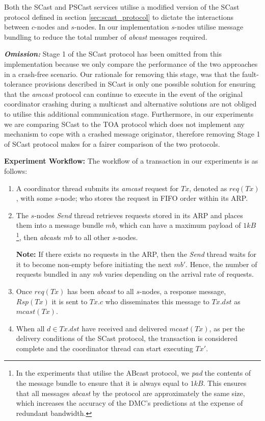 	Both the \textsf{SCast} and \textsf{PSCast} services utilise a modified version of the \textsf{SCast} protocol defined in section \ref{sec:scast_protocol} to dictate the interactions between $c$-nodes and $s$-nodes.  In our implementation $s$-nodes utilise message bundling to reduce the total number of \emph{abcast} messages required.  
	
    \textbf{\emph{Omission:}} Stage 1 of the \textsf{SCast} protocol has been omitted from this implementation because we only compare the performance of the two approaches in a crash-free scenario.  Our rationale for removing this stage, was that the fault-tolerance provisions described in \textsf{SCast} is only one possible solution for ensuring that the \emph{amcast} protocol can continue to execute in the event of the original coordinator crashing during a multicast and alternative solutions are not obliged to utilise this additional communication stage.  Furthermore, in our experiments we are comparing \textsf{SCast} to the \textsf{TOA} protocol which does not implement any mechanism to cope with a crashed message originator, therefore removing Stage 1 of \textsf{SCast} protocol makes for a fairer comparison of the two protocols.  
	
	\textbf{Experiment Workflow:} The workflow of a transaction in our experiments is as follows:
    \begin{enumerate}
        \item    A coordinator thread submits its \emph{amcast} request for $Tx$, denoted as $req(Tx)$, with some $s$-node; who stores the request in FIFO order within its ARP. 
        
        \item    The $s$-nodes \emph{Send} thread retrieves requests stored in its ARP and places them into a message bundle $mb$, which can have a maximum payload of $1kB$ \footnote{In the experiments that utilise the \textsf{ABcast} protocol, we \emph{pad} the contents of the message bundle to ensure that it is always equal to $1kB$.  This ensures that all messages \emph{abcast} by the protocol are approximately the same size, which increases the accuracy of the DMC's predictions at the expense of redundant bandwidth.}, then \emph{abcast}s $mb$ to all other $s$-nodes.  
        
        \textbf{Note:} If there exists no requests in the ARP, then the \emph{Send} thread waits for it to become non-empty before initiating the next $mb'$.  Hence, the number of requests bundled in any $mb$ varies depending on the arrival rate of requests. 
        
        \item    Once $req(Tx)$ has been \emph{abcast} to all $s$-nodes, a response message, $Rsp(Tx)$ it is sent to $Tx.c$ who disseminates this message to $Tx.dst$ as $mcast(Tx)$.  
        
        \item    When all $d \in Tx.dst$ have received and delivered $mcast(Tx)$, as per the delivery conditions of the \textsf{SCast} protocol, the transaction is considered complete and the coordinator thread can start executing $Tx'$.  
    \end{enumerate}	
	
